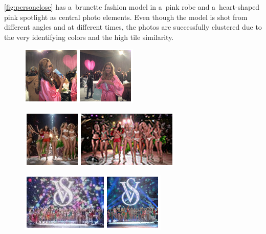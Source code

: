 \autoref{fig:personclose} has a~brunette fashion model in a~pink robe
and a~heart-shaped pink spotlight as central photo elements. 
Even though the model is shot from different angles and at different times,
the photos are successfully clustered due to the very identifying colors
and the high tile similarity. 

\begin{figure}[h!]
  \centering
  \includegraphics[width=0.4\linewidth]{./person.png}
  \caption[]{}
  \label{fig:personclose}
\end{figure}

\begin{figure}[h!]
  \centering
  \includegraphics[width=1.0\linewidth]{./scene.png}
  \caption[]{}
  \label{fig:}
\end{figure}

\begin{figure}[h!]
  \centering
  \includegraphics[width=1.0\linewidth]{./viewing_angle.png}
  \caption[]{}
  \label{fig:}
\end{figure}

